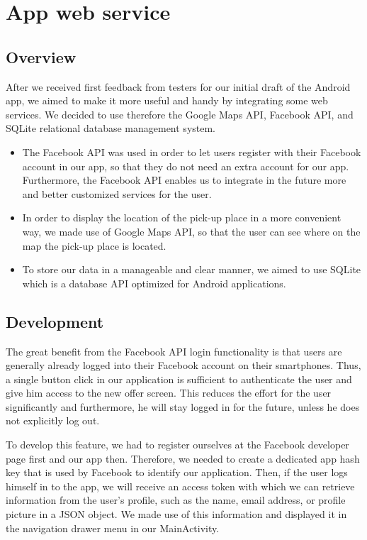 \documentclass[11pt,twoside,a4paper]{report}
\begin{document}
\chapter{App web service}

\section{Overview}

After we received first feedback from testers for our initial draft of the Android app, we aimed to make it more useful and handy by integrating some web services. We decided to use therefore the Google Maps API, Facebook API, and SQLite relational database management system.

\begin{itemize}
\item The Facebook API was used in order to let users register with their Facebook account in our app, so that they do not need an extra account for our app. Furthermore, the Facebook API enables us to integrate in the future more and better customized services for the user.
\item In order to display the location of the pick-up place in a more convenient way, we made use of Google Maps API, so that the user can see where on the map the pick-up place is located.
\item To store our data in a manageable and clear manner, we aimed to use SQLite which is a database API optimized for Android applications.
\end{itemize}

\section{Development}

The great benefit from the Facebook API login functionality is that users are generally already logged into their Facebook account on their smartphones. Thus, a single button click in our application is sufficient to authenticate the user and give him access to the new offer screen. This reduces the effort for the user significantly and furthermore, he will stay logged in for the future, unless he does not explicitly log out.

To develop this feature, we had to register ourselves at the Facebook developer page first and our app then. Therefore, we needed to create a dedicated app hash key that is used by Facebook to identify our application. Then, if the user logs himself in to the app, we will receive an access token with which we can retrieve information from the user's profile, such as the name, email address, or profile picture in a JSON object. We made use of this information and displayed it in the navigation drawer menu in our MainActivity.
\end{document}
